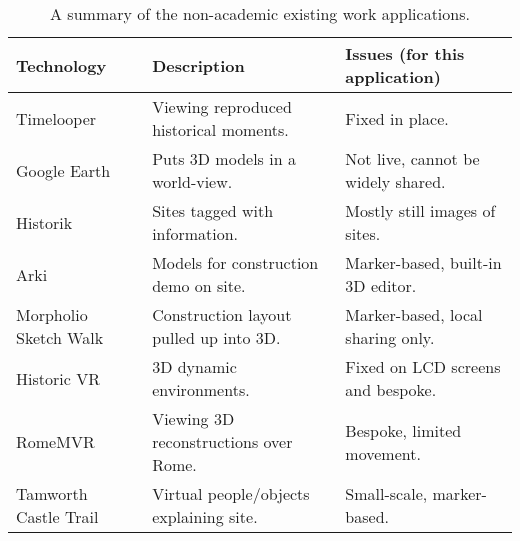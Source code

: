 \documentclass{article}
\begin{document}
\begin{table}[H]
\begin{tabular}{|l|l|l|}
\hline
\rowcolor[HTML]{EFEFEF} 
\textbf{Technology}   & \textbf{Description}                    & \textbf{Issues (for this application)} \\ \hline
Timelooper \cite{existing:timelooper}     & Viewing reproduced historical moments.  & Fixed in place.                        \\ \hline
Google Earth \cite{existing:googleearth}   & Puts 3D models in a world-view.         & Not live, cannot be widely shared.     \\ \hline
Historik \cite{existing:historik}       & Sites tagged with information.          & Mostly still images of sites.          \\ \hline
Arki \cite{existing:arki}           & Models for construction demo on site.   & Marker-based, built-in 3D editor.      \\ \hline
Morpholio Sketch Walk \cite{existing:morpholio} & Construction layout pulled up into 3D.  & Marker-based, local sharing only.      \\ \hline
Historic VR \cite{existing:historicvr}          & 3D dynamic environments.                & Fixed on LCD screens and bespoke.      \\ \hline
RomeMVR \cite{existing:romemvr}              & Viewing 3D reconstructions over Rome.   & Bespoke, limited movement.             \\ \hline
Tamworth Castle Trail \cite{existing:tamworth} & Virtual people/objects explaining site. & Small-scale, marker-based.             \\ \hline
\end{tabular}
\caption{A summary of the non-academic existing work applications.}
\label{table:existingwork}
\end{table}
\end{document}
